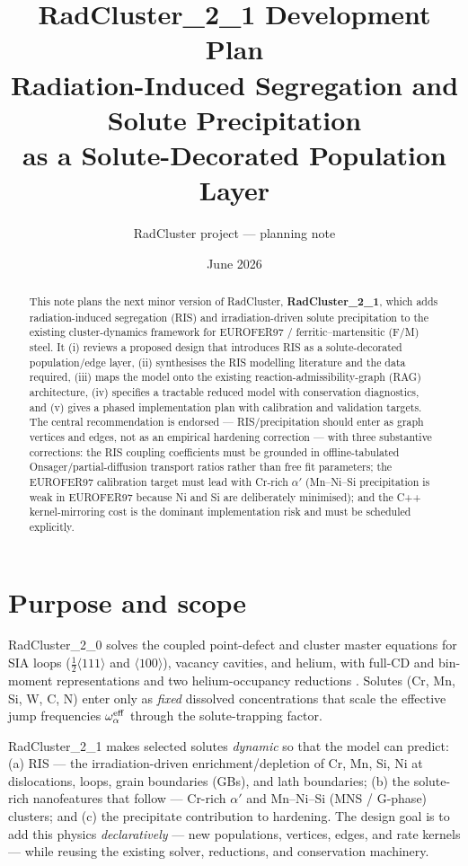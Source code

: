 \documentclass[11pt]{article}
\title{\textbf{RadCluster\_2\_1 Development Plan}\\[2pt]
\large Radiation-Induced Segregation and Solute Precipitation\\
as a Solute-Decorated Population Layer}
\author{RadCluster project --- planning note}
\date{June 2026}
\begin{document}
\maketitle

\begin{abstract}
This note plans the next minor version of RadCluster, \textbf{RadCluster\_2\_1},
which adds radiation-induced segregation (RIS) and irradiation-driven solute
precipitation to the existing cluster-dynamics framework for EUROFER97 /
ferritic--martensitic (F/M) steel. It (i) reviews a proposed design that
introduces RIS as a solute-decorated population/edge layer, (ii) synthesises
the RIS modelling literature and the data required, (iii) maps the model onto
the existing reaction-admissibility-graph (RAG) architecture, (iv) specifies a
tractable reduced model with conservation diagnostics, and (v) gives a phased
implementation plan with calibration and validation targets. The central
recommendation is endorsed --- RIS/precipitation should enter as graph
vertices and edges, not as an empirical hardening correction --- with three
substantive corrections: the RIS coupling coefficients must be grounded in
offline-tabulated Onsager/partial-diffusion transport ratios rather than free
fit parameters; the EUROFER97 calibration target must lead with Cr-rich
$\alpha'$ (Mn--Ni--Si precipitation is weak in EUROFER97 because Ni and Si are
deliberately minimised); and the C++ kernel-mirroring cost is the dominant
implementation risk and must be scheduled explicitly.
\end{abstract}

\tableofcontents

\section{Purpose and scope}
RadCluster\_2\_0 solves the coupled point-defect and cluster master equations
for SIA loops ($\tfrac12\langle111\rangle$ and $\langle100\rangle$), vacancy
cavities, and helium, with full-CD and bin-moment representations and two
helium-occupancy reductions \citep{Ghoniem2026}. Solutes (Cr, Mn, Si, W, C, N)
enter only as \emph{fixed} dissolved concentrations that scale the effective
jump frequencies $\omega^{\rm eff}_\alpha$ through the solute-trapping factor.

RadCluster\_2\_1 makes selected solutes \emph{dynamic} so that the model can
predict: (a) RIS --- the irradiation-driven enrichment/depletion of Cr, Mn,
Si, Ni at dislocations, loops, grain boundaries (GBs), and lath boundaries;
(b) the solute-rich nanofeatures that follow --- Cr-rich $\alpha'$ and
Mn--Ni--Si (MNS / G-phase) clusters; and (c) the precipitate contribution to
hardening. The design goal is to add this physics \emph{declaratively} ---
new populations, vertices, edges, and rate kernels --- while reusing the
existing solver, reductions, and conservation machinery.
\end{document}
